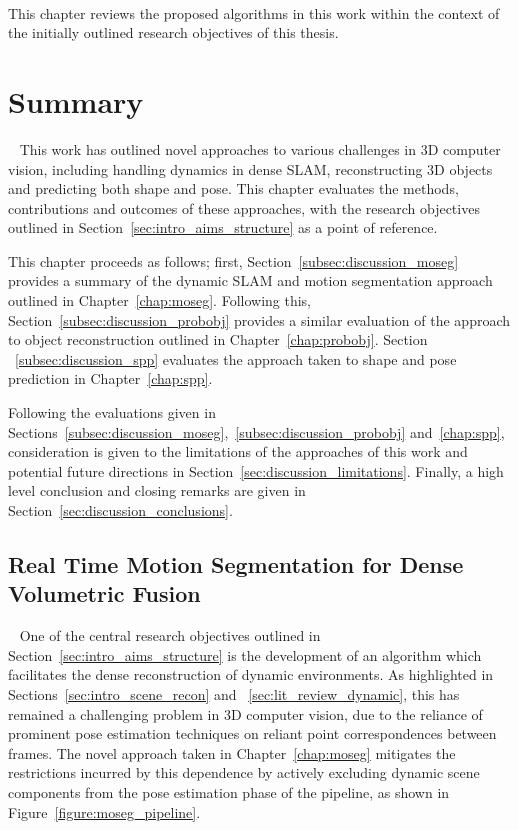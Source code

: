 ~\label{chap:discussion}
\begin{chapterabstract}
This chapter reviews the proposed algorithms in this work within the context 
of the initially outlined research objectives of this thesis.
\end{chapterabstract}

\section{Summary}
~\label{sec:discussion_summary}
This work has outlined novel approaches to various challenges in 3D computer vision, 
including handling dynamics in dense SLAM, reconstructing 3D objects and predicting both 
shape and pose. This chapter evaluates the methods, contributions and outcomes of these 
approaches, with the research objectives outlined in Section~\ref{sec:intro_aims_structure} 
as a point of reference.

This chapter proceeds as follows; first, Section~\ref{subsec:discussion_moseg} provides a 
summary of the dynamic SLAM and motion segmentation approach outlined in Chapter~\ref{chap:moseg}.
Following this, Section~\ref{subsec:discussion_probobj} provides a similar evaluation of the 
approach to object reconstruction outlined in Chapter~\ref{chap:probobj}. Section
~\ref{subsec:discussion_spp} evaluates the approach taken to shape and pose prediction in 
Chapter~\ref{chap:spp}.

Following the evaluations given in Sections~\ref{subsec:discussion_moseg},~\ref{subsec:discussion_probobj} 
and~\ref{chap:spp}, consideration is given to the limitations of the approaches of this work and potential 
future directions in Section~\ref{sec:discussion_limitations}. Finally, a high level conclusion and closing 
remarks are given in Section~\ref{sec:discussion_conclusions}.

\subsection{Real Time Motion Segmentation for Dense Volumetric Fusion}
~\label{subsec:discussion_moseg}
One of the central research objectives outlined in Section~\ref{sec:intro_aims_structure} 
is the development of an algorithm which facilitates the dense reconstruction of dynamic 
environments. As highlighted in Sections~\ref{sec:intro_scene_recon} and
~\ref{sec:lit_review_dynamic}, this has remained a challenging problem in 3D computer vision, 
due to the reliance of prominent pose estimation techniques on reliant point correspondences 
between frames. The novel approach taken in Chapter~\ref{chap:moseg} mitigates the restrictions 
incurred by this dependence by actively excluding dynamic scene components from the pose 
estimation phase of the pipeline, as shown in Figure~\ref{figure:moseg_pipeline}.

